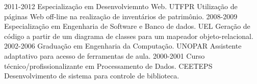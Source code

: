 \documentclass[]{twentysecondcv}
\begin{document}
\begin{twenty}
  \twentyitem
    {2011-2012}
    {Especialização em Desenvolviemnto Web.}
    {UTFPR}
    {Utilização de páginas Web off-line na realização de inventários de patrimônio.}
  \twentyitem
    {2008-2009}
    {Especialização em Engenharia de Software e Banco de dados.}
    {UEL}
    {Geração de código a partir de um diagrama de classes para um mapeador objeto-relacional.}
  \twentyitem
    {2002-2006}
    {Graduação em Engenharia da Computação.}
    {UNOPAR}
    {Assistente adaptativo para acesso de ferramentas de aula.}
  \twentyitem
    {2000-2001}
    {Curso técnico/profissionalizante em Processamento de Dados.}
    {CEETEPS}
    {Desenvolvimento de sistema para controle de biblioteca.}
\end{twenty}







\end{document}
